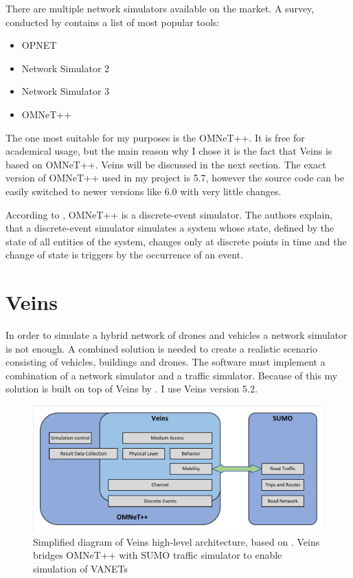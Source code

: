 \documentclass[]{nsm-thesis}
\begin{document}
There are multiple network simulators available on the market. A survey, conducted by \textcite{pan2008survey} contains a list of most popular tools:
\begin{itemize}
\item OPNET \cite[Page~5]{pan2008survey}
\item Network Simulator 2 \cite[Page~7]{pan2008survey}
\item Network Simulator 3 \cite[Page~8]{pan2008survey}
\item OMNeT++ \cite[Page~10]{pan2008survey}
\end{itemize}

The one most suitable for my purposes is the OMNeT++. It is free for academical usage, but the main reason why I chose it is the fact that Veins \cite{Sommer2019} is based on OMNeT++. Veins will be discussed in the next section. The exact version of OMNeT++ used in my project is 5.7, however the source code can be easily switched to newer versions like 6.0 with very little changes.

According to \textcite[Page~2]{Varga2010}, OMNeT++ is a discrete-event simulator. The authors explain, that a discrete-event simulator simulates a system whose state, defined by the state of all entities of the system, changes only at discrete points in time and the change of state is triggers by the occurrence of an event.

\section {Veins}

In order to simulate a hybrid network of drones and vehicles a network simulator is not enough. A combined solution is needed to create a realistic scenario consisting of vehicles, buildings and drones. The software must implement a combination of a network simulator and a traffic simulator. Because of this my solution is built on top of Veins by \textcite{Sommer2019}. I use Veins version 5.2.

\begin{figure}
  	\centering
	\includegraphics[width=1\textwidth]{figures/VeinsHighLevel.pdf}
	\caption{Simplified diagram of Veins high-level architecture, based on \cite{Sommer2019}. Veins bridges OMNeT++ with SUMO traffic simulator to enable simulation of \acp{VANET} \cite{Sommer2019}}
	\label{fig:veinshighlevel}
\end{figure}
\end{document}

